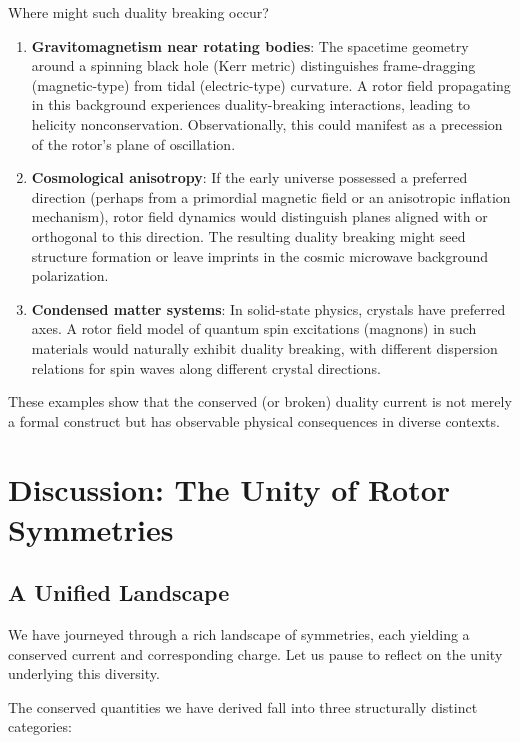 \documentclass[11pt,a4paper]{article}
\numberwithin{equation}{section}
\theoremstyle{plain}
\theoremstyle{definition}
\theoremstyle{remark}
\begin{document}
Where might such duality breaking occur?

\begin{enumerate}
  \item \textbf{Gravitomagnetism near rotating bodies}: The spacetime geometry around a spinning black hole (Kerr metric) distinguishes frame-dragging (magnetic-type) from tidal (electric-type) curvature. A rotor field propagating in this background experiences duality-breaking interactions, leading to helicity nonconservation. Observationally, this could manifest as a precession of the rotor's plane of oscillation.

  \item \textbf{Cosmological anisotropy}: If the early universe possessed a preferred direction (perhaps from a primordial magnetic field or an anisotropic inflation mechanism), rotor field dynamics would distinguish planes aligned with or orthogonal to this direction. The resulting duality breaking might seed structure formation or leave imprints in the cosmic microwave background polarization.

  \item \textbf{Condensed matter systems}: In solid-state physics, crystals have preferred axes. A rotor field model of quantum spin excitations (magnons) in such materials would naturally exhibit duality breaking, with different dispersion relations for spin waves along different crystal directions.
\end{enumerate}

These examples show that the conserved (or broken) duality current is not merely a formal construct but has observable physical consequences in diverse contexts.

\section{Discussion: The Unity of Rotor Symmetries}
\label{sec:discussion}

\subsection{A Unified Landscape}

We have journeyed through a rich landscape of symmetries, each yielding a conserved current and corresponding charge. Let us pause to reflect on the unity underlying this diversity.

The conserved quantities we have derived fall into three structurally distinct categories:
\end{document}
